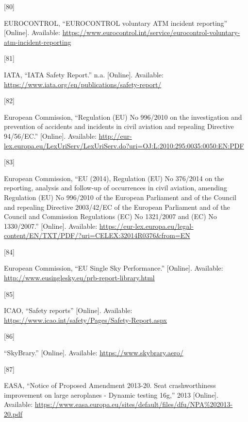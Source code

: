 \documentclass[
  11pt,
  a4paper,
]{book}
\newlength{\cslhangindent}
\newlength{\csllabelwidth}
\newlength{\cslentryspacingunit} %
\newenvironment{CSLReferences}[2] %
 {%
  \setlength{\parindent}{0pt}
  \ifodd #1
  \let\oldpar\par
  \def\par{\hangindent=\cslhangindent\oldpar}
  \fi
  \setlength{\parskip}{#2\cslentryspacingunit}
 }%
 {}
\newcommand{\CSLLeftMargin}[1]{\parbox[t]{\csllabelwidth}{#1}}
\newcommand{\CSLRightInline}[1]{\parbox[t]{\linewidth - \csllabelwidth}{#1}\break}
\begin{document}
\begin{CSLReferences}{0}{0}
\leavevmode{}%
\CSLLeftMargin{{[}80{]} }%
\CSLRightInline{EUROCONTROL, {``{EUROCONTROL} voluntary {ATM} incident
reporting''} {[}Online{]}. Available:
\url{https://www.eurocontrol.int/service/eurocontrol-voluntary-atm-incident-reporting}}

\leavevmode{}%
\CSLLeftMargin{{[}81{]} }%
\CSLRightInline{IATA, {``{IATA Safety Report}.''} n.a. {[}Online{]}.
Available: \url{https://www.iata.org/en/publications/safety-report/}}

\leavevmode{}%
\CSLLeftMargin{{[}82{]} }%
\CSLRightInline{European Commission, {``Regulation ({EU}) {No} 996/2010
on the investigation and prevention of accidents and incidents in civil
aviation and repealing {Directive} 94/56/{EC}.''} {[}Online{]}.
Available:
\url{http://eur-lex.europa.eu/LexUriServ/LexUriServ.do?uri=OJ:L:2010:295:0035:0050:EN:PDF}}

\leavevmode{}%
\CSLLeftMargin{{[}83{]} }%
\CSLRightInline{European Commission, {``{EU} (2014), {Regulation} ({EU})
{No} 376/2014 on the reporting, analysis and follow-up of occurrences in
civil aviation, amending {Regulation} ({EU}) {No} 996/2010 of the
{European Parliament} and of the {Council} and repealing {Directive}
2003/42/{EC} of the {European Parliament} and of the {Council} and
{Commission Regulations} ({EC}) {No} 1321/2007 and ({EC}) {No}
1330/2007.''} {[}Online{]}. Available:
\url{https://eur-lex.europa.eu/legal-content/EN/TXT/PDF/?uri=CELEX:32014R0376\&from=EN}}

\leavevmode{}%
\CSLLeftMargin{{[}84{]} }%
\CSLRightInline{European Commission, {``{EU Single Sky Performance}.''}
{[}Online{]}. Available:
\url{http://www.eusinglesky.eu/prb-report-library.html}}

\leavevmode{}%
\CSLLeftMargin{{[}85{]} }%
\CSLRightInline{ICAO, {``Safety reports''} {[}Online{]}. Available:
\url{https://www.icao.int/safety/Pages/Safety-Report.aspx}}

\leavevmode{}%
\CSLLeftMargin{{[}86{]} }%
\CSLRightInline{{``{SkyBrary}.''} {[}Online{]}. Available:
\url{https://www.skybrary.aero/}}

\leavevmode{}%
\CSLLeftMargin{{[}87{]} }%
\CSLRightInline{EASA, {``Notice of {Proposed Amendment} 2013-20. {Seat}
crashworthiness improvement on large aeroplanes - {Dynamic} testing
16g,''} 2013 {[}Online{]}. Available:
\url{https://www.easa.europa.eu/sites/default/files/dfu/NPA\%202013-20.pdf}}


\end{CSLReferences}
\end{document}
